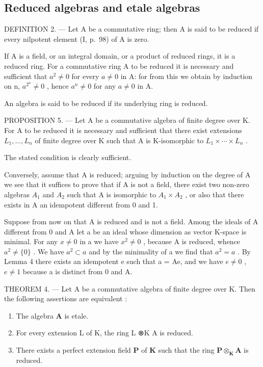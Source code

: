 \subsection{Reduced algebras and etale algebras}

DEFINITION 2. --- Let A be a commutative ring; then A is said to be reduced if every nilpotent element (I, p.~98) of A is zero.

If A is a field, or an integral domain, or a product of reduced rings, it is a reduced ring. For a commutative ring A to be reduced it is necessary and sufficient that \(a^{2} \neq 0\) for every \(a \neq 0\) in A: for from this we obtain by induction on n, \(a^{2^{n}} \neq 0\) , hence \(a^{n} \neq 0\) for any \(a \neq 0\) in A.

An algebra is said to be reduced if its underlying ring is reduced.

PROPOSITION 5. --- Let A be a commutative algebra of finite degree over K. For A to be reduced it is necessary and sufficient that there exist extensions \(L_{1}, \ldots, L_{n}\) of finite degree over K such that A is K-isomorphic to \(L_{1} \times \cdots \times L_{n}\) .

The stated condition is clearly sufficient.

Conversely, assume that A is reduced; arguing by induction on the degree of A we see that it suffices to prove that if A is not a field, there exist two non-zero algebras \(A_{1}\) and \(A_{2}\) such that A is isomorphic to \(A_{1} \times A_{2}\) , or also that there exists in A an idempotent different from 0 and 1.

Suppose from now on that A is reduced and is not a field. Among the ideals of A different from 0 and A let a be an ideal whose dimension as vector K-space is minimal. For any \(x \neq 0\) in a we have \(x^{2} \neq 0\) , because A is reduced, whence \(a^{2} \neq \{0\}\) . We have \(a^{2} \subset a\) and by the minimality of a we find that \(a^{2} = a\) . By Lemma 4 there exists an idempotent e such that a = Ae, and we have \(e \neq 0\) , \(e \neq 1\) because a is distinct from 0 and A.

THEOREM 4. --- Let A be a commutative algebra of finite degree over K. Then the following assertions are equivalent :

\begin{enumerate}
\def\labelenumi{\alph{enumi})}
\item
  The algebra \(\mathbf{A}\) is etale.
\item
  For every extension L of K, the ring L ⊗K A is reduced.
\item
  There exists a perfect extension field \(\mathbf{P}\) of \(\mathbf{K}\) such that the ring \(\mathbf{P} \otimes_{\mathbf{K}} \mathbf{A}\) is reduced.
\end{enumerate}

